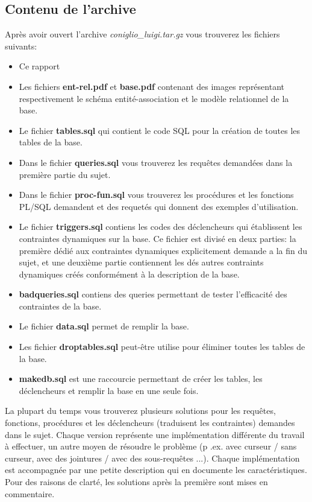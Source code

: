 \documentclass[twoside,openright,a4paper,11pt,french]{article}
\begin{document}
\subsection{Contenu de l'archive}
Après avoir ouvert l'archive {\it coniglio\_luigi.tar.gz} vous
trouverez les fichiers suivants:
\smallbreak
\begin{itemize}
\item Ce rapport
\item Les fichiers {\bf ent-rel.pdf} et {\bf base.pdf} contenant des images
      représentant respectivement le schéma entité-association et le modèle
      relationnel de la base.
\item Le fichier {\bf tables.sql} qui contient le code SQL pour la création 
      de toutes les tables de la base.
\item Dans le fichier {\bf queries.sql} vous trouverez les requêtes demandées
      dans la première partie du sujet.
\item Dans le fichier {\bf proc-fun.sql} vous trouverez les procédures et 
      les fonctions PL/SQL demandent et des requetés qui donnent des exemples d'utilisation.
\item Le fichier {\bf triggers.sql} contiens les codes des déclencheurs qui
      établissent les contraintes dynamiques sur la base. Ce fichier est divisé en
      deux parties: la première dédié aux contraintes dynamiques explicitement
      demande a la fin du sujet, et une deuxième partie contiennent les dés autres
      contraints dynamiques créés conformément à la description de la base.

\item {\bf badqueries.sql} contiens des queries permettant de tester l'efficacité 
      des contraintes de la base.
\item Le fichier {\bf data.sql} permet de remplir la base.
\item Les fichier {\bf droptables.sql} peut-être utilise pour éliminer toutes 
      les tables de la base.
\item {\bf makedb.sql} est une raccourcie permettant de créer les tables, les 
      déclencheurs et remplir la base en une seule fois.
\end{itemize}

\bigbreak
La plupart du temps vous trouverez plusieurs solutions pour les requêtes,
fonctions, procédures et les déclencheurs (traduisent les contraintes) demandes
dans le sujet. Chaque version représente une implémentation différente du
travail à effectuer, un autre moyen de résoudre le problème (p .ex. avec
curseur / sans curseur, avec des jointures / avec des sous-requêtes ...).
Chaque implémentation est accompagnée par une petite description qui en
documente les caractéristiques. Pour des raisons de clarté, les solutions après
la première sont mises en commentaire.
\end{document}
